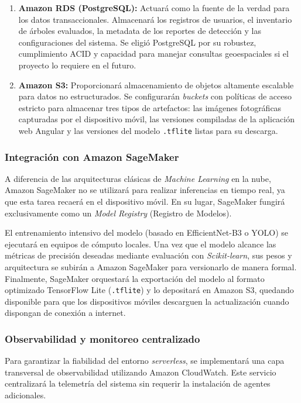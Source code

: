 \begin{enumerate}
    \item \textbf{Amazon RDS (PostgreSQL):} Actuará como la fuente de la verdad para los datos transaccionales. Almacenará los registros de usuarios, el inventario de árboles evaluados, la metadata de los reportes de detección y las configuraciones del sistema. Se eligió PostgreSQL por su robustez, cumplimiento ACID y capacidad para manejar consultas geoespaciales si el proyecto lo requiere en el futuro.
    \item \textbf{Amazon S3:} Proporcionará almacenamiento de objetos altamente escalable para datos no estructurados. Se configurarán \textit{buckets} con políticas de acceso estricto para almacenar tres tipos de artefactos: las imágenes fotográficas capturadas por el dispositivo móvil, las versiones compiladas de la aplicación web Angular y las versiones del modelo \texttt{.tflite} listas para su descarga.
\end{enumerate}

\subsubsection{Integración con Amazon SageMaker}

A diferencia de las arquitecturas clásicas de \textit{Machine Learning} en la nube, Amazon SageMaker no se utilizará para realizar inferencias en tiempo real, ya que esta tarea recaerá en el dispositivo móvil. En su lugar, SageMaker fungirá exclusivamente como un \textit{Model Registry} (Registro de Modelos).

El entrenamiento intensivo del modelo (basado en EfficientNet-B3 o YOLO) se ejecutará en equipos de cómputo locales. Una vez que el modelo alcance las métricas de precisión deseadas mediante evaluación con \textit{Scikit-learn}, sus pesos y arquitectura se subirán a Amazon SageMaker para versionarlo de manera formal. Finalmente, SageMaker orquestará la exportación del modelo al formato optimizado TensorFlow Lite (\texttt{.tflite}) y lo depositará en Amazon S3, quedando disponible para que los dispositivos móviles descarguen la actualización cuando dispongan de conexión a internet.

\subsubsection{Observabilidad y monitoreo centralizado}

Para garantizar la fiabilidad del entorno \textit{serverless}, se implementará una capa transversal de observabilidad utilizando Amazon CloudWatch. Este servicio centralizará la telemetría del sistema sin requerir la instalación de agentes adicionales.


